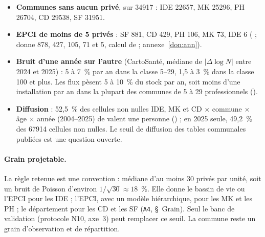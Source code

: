 \begin{itemize}
  \item \textbf{Communes sans aucun privé}, sur \num{34917}\mesure{} : IDE \num{22657}\mesure, MK
  \num{25296}\mesure, PH \num{26704}\mesure, CD \num{29538}\mesure, SF \num{31951}\mesure.
  \item \textbf{EPCI de moins de 5 privés} : SF 881\mesure, CD 429\mesure, PH 106\mesure, MK 73\mesure, IDE
  6\mesure{} ( ;  donne 878, 427, 105, 71 et 5\mesure, calcul de
   ; annexe~\ref{don:ann}).
  \item \textbf{Bruit d'une année sur l'autre} (CartoSanté, médiane de $|\Delta \log N|$ entre 2024 et 2025) :
  5 à 7~\%\mesure{} par an dans la classe 5--29, 1,5 à 3~\%\mesure{} dans la classe 100 et plus. Les flux pèsent
  5 à 10~\%\derive{} du stock par an, soit moins d'une installation par an dans la plupart des communes de 5 à
  29 professionnels\derive{} ().
  \item \textbf{Diffusion} : 52,5~\%\mesure{} des cellules non nulles IDE, MK et CD $\times$ commune $\times$ âge
  $\times$ année (2004--2025) de  valent une personne
  () ; en 2025 seule, 49,2~\%\mesure{} des \num{67914}\mesure{}
  cellules non nulles. Le seuil de
  diffusion des tables communales publiées est une question ouverte.
\end{itemize}

\paragraph{Grain projetable.} La règle retenue est une convention : médiane d'au moins 30\suppose{} privés par
unité, soit un bruit de Poisson d'environ $1/\sqrt{30} \approx 18$~\%\derive. Elle donne le bassin de vie ou
l'EPCI pour les IDE ; l'EPCI, avec un modèle hiérarchique, pour les MK et les PH ; le département pour les CD et
les SF (\texttt{A4}, \S~Grain). Seul le banc de validation (protocole N10, axe~3) peut remplacer ce seuil. La
commune reste un grain d'observation et de répartition.

